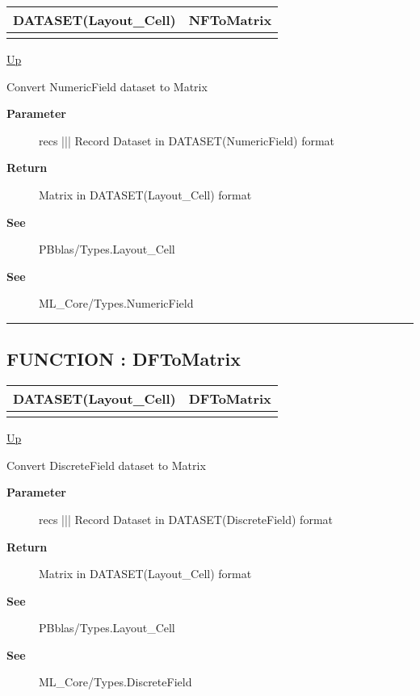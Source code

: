 {\renewcommand{\arraystretch}{1.5}
\begin{tabularx}{\textwidth}{|>{\raggedright\arraybackslash}l|X|}
\hline
\hspace{0pt}DATASET(Layout\_Cell) & NFToMatrix \\
\hline
\multicolumn{2}{|>{\raggedright\arraybackslash}X|}{\hspace{0pt}(DATASET(NumericField) recs)} \\
\hline
\end{tabularx}
}

\hyperlink{ecldoc:PBblas.Converted}{Up}

\par
Convert NumericField dataset to Matrix

\par
\begin{description}
\item [\textbf{Parameter}] recs ||| Record Dataset in DATASET(NumericField) format
\item [\textbf{Return}] Matrix in DATASET(Layout\_Cell) format
\item [\textbf{See}] PBblas/Types.Layout\_Cell
\item [\textbf{See}] ML\_Core/Types.NumericField
\end{description}

\rule{\textwidth}{0.4pt}
\subsection*{FUNCTION : DFToMatrix}
\hypertarget{ecldoc:pbblas.converted.dftomatrix}{}

{\renewcommand{\arraystretch}{1.5}
\begin{tabularx}{\textwidth}{|>{\raggedright\arraybackslash}l|X|}
\hline
\hspace{0pt}DATASET(Layout\_Cell) & DFToMatrix \\
\hline
\multicolumn{2}{|>{\raggedright\arraybackslash}X|}{\hspace{0pt}(DATASET(DiscreteField) recs)} \\
\hline
\end{tabularx}
}

\hyperlink{ecldoc:PBblas.Converted}{Up}

\par
Convert DiscreteField dataset to Matrix

\par
\begin{description}
\item [\textbf{Parameter}] recs ||| Record Dataset in DATASET(DiscreteField) format
\item [\textbf{Return}] Matrix in DATASET(Layout\_Cell) format
\item [\textbf{See}] PBblas/Types.Layout\_Cell
\item [\textbf{See}] ML\_Core/Types.DiscreteField
\end{description}

